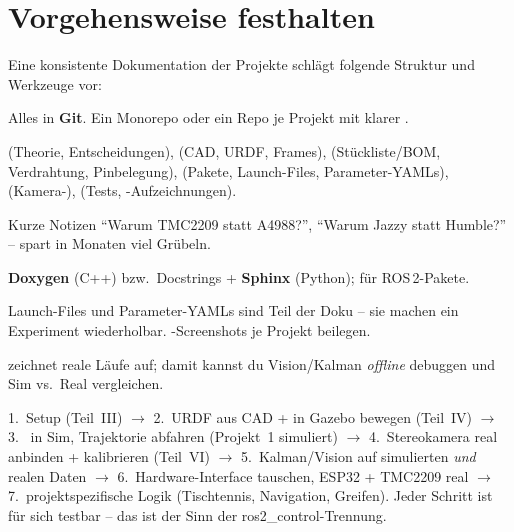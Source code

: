 
\chapter{Vorgehensweise festhalten}

Eine konsistente Dokumentation der Projekte schlägt folgende Struktur und
Werkzeuge vor:
\begin{description}[style=nextline,leftmargin=1.4em]
\item[Versionskontrolle] Alles in \textbf{Git}. Ein Monorepo oder ein Repo je
  Projekt mit klarer .
\item[Verzeichnisstruktur]
   (Theorie, Entscheidungen),
   (CAD, URDF, Frames),
   (Stückliste/BOM, Verdrahtung, Pinbelegung),
   (Pakete, Launch-Files, Parameter-YAMLs),
   (Kamera-),
   (Tests, -Aufzeichnungen).
\item[Entscheidungsprotokoll (ADR)] Kurze Notizen ``Warum TMC2209 statt
  A4988?'', ``Warum Jazzy statt Humble?'' -- spart in Monaten viel Grübeln.
\item[Code-Doku] \textbf{Doxygen} (C++) bzw.\ Docstrings + \textbf{Sphinx}
  (Python);  für ROS\,2-Pakete.
\item[Reproduzierbarkeit] Launch-Files und Parameter-YAMLs sind Teil der Doku
  -- sie machen ein Experiment wiederholbar. -Screenshots je
  Projekt beilegen.
\item[Nachweise]  zeichnet reale Läufe auf; damit kannst du
  Vision/Kalman \emph{offline} debuggen und Sim vs.\ Real vergleichen.
\end{description}

\begin{infobox}[title=Empfohlene Reihenfolge der Umsetzung]
1.\ Setup (Teil~III)
$\rightarrow$ 2.\ URDF aus CAD + in Gazebo bewegen (Teil~IV)
$\rightarrow$ 3.\  in Sim, Trajektorie abfahren (Projekt~1 simuliert)
$\rightarrow$ 4.\ Stereokamera real anbinden + kalibrieren (Teil~VI)
$\rightarrow$ 5.\ Kalman/Vision auf simulierten \emph{und} realen Daten
$\rightarrow$ 6.\ Hardware-Interface tauschen, ESP32 + TMC2209 real
$\rightarrow$ 7.\ projektspezifische Logik (Tischtennis, Navigation, Greifen).
Jeder Schritt ist für sich testbar -- das ist der Sinn der
ros2\_control-Trennung.
\end{infobox}
